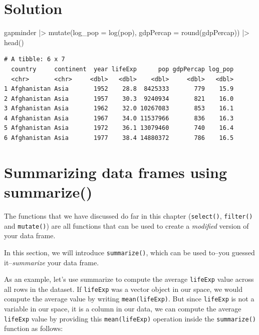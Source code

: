 \documentclass[
  letterpaper,
  DIV=11,
  numbers=noendperiod]{scrreprt}
\newenvironment{Shaded}{\begin{snugshade}}{\end{snugshade}}
\newcommand{\AttributeTok}[1]{\textcolor[rgb]{0.40,0.45,0.13}{#1}}
\newcommand{\FunctionTok}[1]{\textcolor[rgb]{0.28,0.35,0.67}{#1}}
\newcommand{\NormalTok}[1]{\textcolor[rgb]{0.00,0.23,0.31}{#1}}
\newcommand{\SpecialCharTok}[1]{\textcolor[rgb]{0.37,0.37,0.37}{#1}}
\begin{document}
\section{Solution}

\begin{Shaded}
\begin{Highlighting}[]
\NormalTok{gapminder }\SpecialCharTok{|\textgreater{}} 
  \FunctionTok{mutate}\NormalTok{(}\AttributeTok{log\_pop =} \FunctionTok{log}\NormalTok{(pop), }\AttributeTok{gdpPercap =} \FunctionTok{round}\NormalTok{(gdpPercap)) }\SpecialCharTok{|\textgreater{}} 
  \FunctionTok{head}\NormalTok{()}
\end{Highlighting}
\end{Shaded}

\begin{verbatim}
# A tibble: 6 x 7
  country     continent  year lifeExp      pop gdpPercap log_pop
  <chr>       <chr>     <dbl>   <dbl>    <dbl>     <dbl>   <dbl>
1 Afghanistan Asia       1952    28.8  8425333       779    15.9
2 Afghanistan Asia       1957    30.3  9240934       821    16.0
3 Afghanistan Asia       1962    32.0 10267083       853    16.1
4 Afghanistan Asia       1967    34.0 11537966       836    16.3
5 Afghanistan Asia       1972    36.1 13079460       740    16.4
6 Afghanistan Asia       1977    38.4 14880372       786    16.5
\end{verbatim}

\section{Summarizing data frames using
summarize()}\label{summarizing-data-frames-using-summarize}

The functions that we have discussed do far in this chapter
(\texttt{select()}, \texttt{filter()} and \texttt{mutate()}) are all
functions that can be used to create a \emph{modified} version of your
data frame.

In this section, we will introduce \texttt{summarize()}, which can be
used to--you guessed it--\emph{summarize} your data frame.

As an example, let's use summarize to compute the average
\texttt{lifeExp} value across all rows in the dataset. If
\texttt{lifeExp} was a vector object in our space, we would compute the
average value by writing \texttt{mean(lifeExp)}. But since
\texttt{lifeExp} is not a variable in our space, it is a column in our
data, we can compute the average \texttt{lifeExp} value by providing
this \texttt{mean(lifeExp)} operation inside the \texttt{summarize()}
function as follows:
\end{document}
